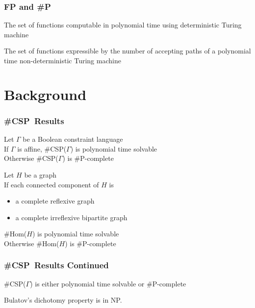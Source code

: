 \documentclass[a4paper,handout]{beamer}
\newcommand{\ccsp}{\#CSP}
\newcommand{\chom}{\#Hom}
\newcommand{\cp}{\#P}
\newcommand{\cpc}{\#P-complete}
\theoremstyle{definition}
\begin{document}
\begin{frame}
\frametitle{FP and \cp}
\begin{definition} [FP]
The set of functions computable in polynomial time using deterministic Turing machine
\end{definition}

\begin{definition}[\cp]
The set of functions expressible by the number of accepting paths of a polynomial time non-deterministic Turing machine
\end{definition}
\end{frame}

\section{Background}

\begin{frame}
\frametitle{\ccsp\ Results}
\begin{theorem} 
Let \(\Gamma\) be a Boolean constraint language\\
If \(\Gamma\) is affine, \ccsp(\(\Gamma\)) is polynomial time solvable\\
Otherwise \ccsp(\(\Gamma\)) is \cpc
\end{theorem}

\pause

\begin{theorem}  
Let \(H\) be a graph\\
If each connected component of \(H\) is 
\begin{itemize}
\item a complete reflexive graph
\item a complete irreflexive bipartite graph
\end{itemize}
\chom(\(H\)) is polynomial time solvable\\
Otherwise \chom(\(H\)) is \cpc
\end{theorem}
\end{frame}

\begin{frame}
\frametitle{\ccsp\ Results Continued}
\begin{theorem} [Bulatov 2008]
\ccsp(\(\Gamma\)) is either polynomial time solvable or \cpc
\end{theorem}
\pause

\begin{theorem}
Bulatov's dichotomy property is in NP.
\end{theorem}
\end{frame}
\end{document}
